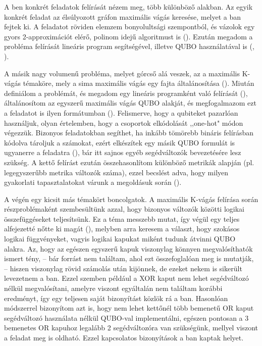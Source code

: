  
A ben konkrét feladatok felírását nézem meg, több különböző alakban. Az egyik konkrét feladat az élsúlyozott gráfon maximális vágás keresése, melyet a ban fejtek ki. A feladatot röviden elemzem bonyolultsági szempontból, és vázolok egy gyors 2-approximációt elérő, polinom idejű algoritmust is ().
Ezután megadom a probléma felírását lineáris program segítségével, illetve QUBO használatával is (, ).

A másik nagy volumenű probléma, melyet górcső alá veszek, az a maximális K-vágás témaköre, mely a sima maximális vágás egy fajta általánosítása (). Miután definiálom a problémát, és megadom egy lineáris programként való felírását (), általánosítom az egyszerű maximális vágás QUBO alakját, és megfogalmazom ezt a feladatot is ilyen formátumban (). Felismerve, hogy a qubiteket pazarlóan használjuk, olyan értelemben, hogy a csoportok elkódolását ,,one-hot" módon végezzük. Bizonyos feladatokban segíthet, ha inkább tömörebb bináris felírásban kódolva tároljuk a számokat, ezért elkészítek egy másik QUBO formulát is ugyanerre a feladatra (), bár itt sajnos egyéb segédváltozók bevezetésére lesz szükség. A kettő felírást ezután összehasonlítom különböző metrikák alapján (pl. legegyszerűbb metrika változók száma), ezzel becslést adva, hogy milyen gyakorlati tapasztalatokat várunk a megoldásuk során ().

A  végén egy kicsit más témakört boncolgatok. A maximális K-vágás felírása során részproblémaként szembesültünk azzal, hogy bizonyos változók közötti logikai összefüggéseket teljesítsünk. Ez a téma messzebb mutat, így végül egy teljes alfejezetté nőtte ki magát (), melyben arra keresem a választ, hogy szokásos logikai függvényeket, vagyis logikai kapukat miként tudunk átvinni QUBO alakra. Az, hogy az egészen egyszerű kapuk viszonylag könnyen megvalósíthatók ismert tény, -- bár forrást nem találtam, ahol ezt összefoglalóan meg is mutatják, -- hiszen viszonylag rövid számolás után kijönnek, de ezeket nekem is sikerült levezetnem a ban. Ezzel szemben például a XOR kaput nem lehet segédváltozó nélkül megvalósítani, amelyre viszont egyáltalán nem találtam korábbi eredményt, így egy teljesen saját bizonyítást közlök rá a ban. Hasonlóan módszerrel bizonyítom azt is, hogy nem lehet kettőnél több bemenetű OR kaput segédváltozó használata nélkül QUBO-val implementálni, egészen pontosan a 3 bemenetes OR kapuhoz legalább 2 segédváltozóra van szükségünk, mellyel viszont a feladat meg is oldható. Ezzel kapcsolatos bizonyítások a ban kaptak helyet.


